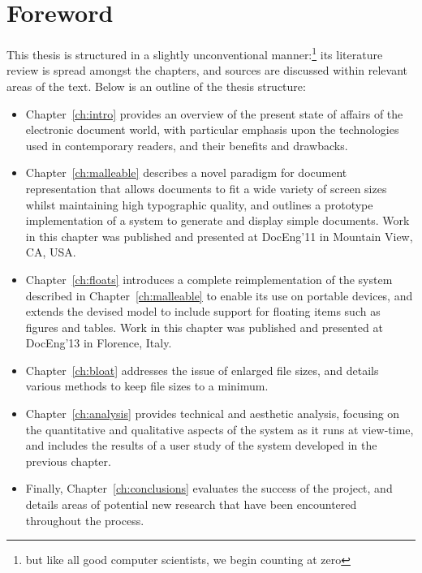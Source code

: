 \cleardoublepage
\chapter{Foreword}
\setcounter{footnote}{-1}
This thesis is structured in a slightly unconventional manner:\footnote{but like all good computer scientists, we begin counting at zero} its literature review is spread amongst the chapters, and sources are discussed within relevant areas of the text. Below is an outline of the thesis structure:

\begin{itemize}
\item Chapter~\ref{ch:intro} provides an overview of the present state of affairs of the electronic document world, with particular emphasis upon the technologies used in contemporary \ebook{} readers, and their benefits and drawbacks.

\item Chapter~\ref{ch:malleable} describes a novel paradigm for document representation that allows documents to fit a wide variety of screen sizes whilst maintaining high typographic quality, and outlines a prototype implementation of a system to generate and display simple documents. Work in this chapter was published and presented at DocEng'11 in Mountain View, CA, USA.\cite{Pinkney2011}

\item Chapter~\ref{ch:floats} introduces a complete reimplementation of the system described in Chapter~\ref{ch:malleable} to enable its use on portable devices, and extends the devised model to include support for floating items such as figures and tables. Work in this chapter was published and presented at DocEng'13 in Florence, Italy.\cite{Pinkney2013}

\item Chapter~\ref{ch:bloat} addresses the issue of enlarged file sizes, and details various methods to keep file sizes to a minimum.

\item Chapter~\ref{ch:analysis} provides technical and aesthetic analysis, focusing on the quantitative and qualitative aspects of the system as it runs at view-time, and includes the results of a user study of the system developed in the previous chapter.

\item Finally, Chapter~\ref{ch:conclusions} evaluates the success of the project, and details areas of potential new research that have been encountered throughout the process.
\end{itemize}
